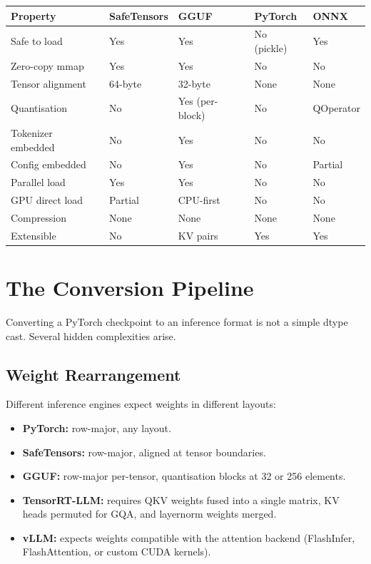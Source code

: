 \documentclass[11pt,a4paper]{article}
\theoremstyle{definition}
\begin{document}
\begin{longtable}{p{2.5cm}p{3cm}p{3cm}p{3cm}p{3cm}}
	\toprule
	\textbf{Property}  & \textbf{SafeTensors} & \textbf{GGUF}   & \textbf{PyTorch} & \textbf{ONNX} \\
	\midrule
	Safe to load       & Yes                  & Yes             & No (pickle)      & Yes           \\
	Zero-copy mmap     & Yes                  & Yes             & No               & No            \\
	Tensor alignment   & 64-byte              & 32-byte         & None             & None          \\
	Quantisation       & No                   & Yes (per-block) & No               & QOperator     \\
	Tokenizer embedded & No                   & Yes             & No               & No            \\
	Config embedded    & No                   & Yes             & No               & Partial       \\
	Parallel load      & Yes                  & Yes             & No               & No            \\
	GPU direct load    & Partial              & CPU-first       & No               & No            \\
	Compression        & None                 & None            & None             & None          \\
	Extensible         & No                   & KV pairs        & Yes              & Yes           \\
	\bottomrule
\end{longtable}

\section{The Conversion Pipeline}
\label{sec:conversion}

Converting a PyTorch checkpoint to an inference format is not a simple dtype cast. Several hidden complexities arise.

\subsection{Weight Rearrangement}

Different inference engines expect weights in different layouts:

\begin{itemize}
	\item \textbf{PyTorch:} row-major, any layout.
	\item \textbf{SafeTensors:} row-major, aligned at tensor boundaries.
	\item \textbf{GGUF:} row-major per-tensor, quantisation blocks at 32 or 256 elements.
	\item \textbf{TensorRT-LLM:} requires QKV weights fused into a single matrix, KV heads permuted for GQA, and layernorm weights merged.
	\item \textbf{vLLM:} expects weights compatible with the attention backend (FlashInfer, FlashAttention, or custom CUDA kernels).
\end{itemize}
\end{document}

